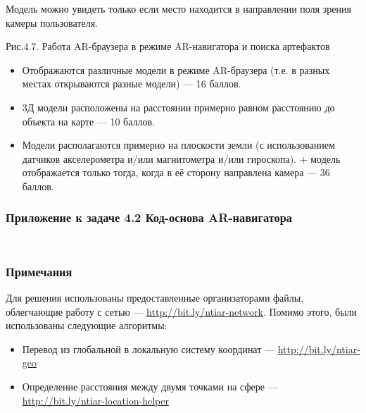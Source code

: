 Модель можно увидеть только если место находится в направлении поля зрения камеры пользователя.


\begin{center}
Рис.4.7. Работа AR-браузера в режиме AR-навигатора и поиска артефактов
\end{center}

\markSection

\begin{itemize}
    \item Отображаются различные модели в режиме AR-браузера (т.е. в разных местах открываются разные модели) — 16 баллов.
    \item 3Д модели расположены на расстоянии примерно равном расстоянию до объекта на карте — 10 баллов.
    \item Модели располагаются примерно на плоскости земли (с использованием датчиков акселерометра и/или магнитометра и/или гироскопа). + модель отображается только тогда, когда в её сторону направлена камера — 36 баллов.
\end{itemize}

\subsubsection*{Приложение к задаче 4.2 Код-основа AR-навигатора}

\inputminted[fontsize=\footnotesize, linenos]{csharp}{final/command_tour/ar/task_04/source3-1.cs}
\inputminted[fontsize=\footnotesize, linenos]{csharp}{final/command_tour/ar/task_04/source3-2.cs}


\subsubsection*{Примечания}

Для решения использованы предоставленные организаторами файлы, облегчающие работу с сетью — \url{http://bit.ly/ntiar-network}. Помимо этого, были использованы следующие алгоритмы:
\begin{itemize}
    \item Перевод из глобальной в локальную систему координат — \url{http://bit.ly/ntiar-geo}
    \item Определение расстояния между двумя точками на сфере — \url{http://bit.ly/ntiar-location-helper}
\end{itemize}